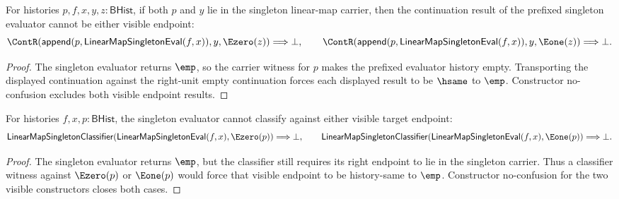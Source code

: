 \begin{theorem}
\label{thm:singleton-linearmap-eval-context-continuation-visible-result-absurd}
For histories $p,f,x,y,z:\mathsf{BHist}$, if both $p$ and $y$ lie in the
singleton linear-map carrier, then the continuation result of the prefixed
singleton evaluator cannot be either visible endpoint:
$$
\ContR(\mathsf{append}(p,\mathsf{LinearMapSingletonEval}(f,x)),y,\Ezero(z))
\Longrightarrow\bot,
\qquad
\ContR(\mathsf{append}(p,\mathsf{LinearMapSingletonEval}(f,x)),y,\Eone(z))
\Longrightarrow\bot.
$$
\end{theorem}
\begin{proof}
The singleton evaluator returns $\emp$, so the carrier witness for $p$ makes
the prefixed evaluator history empty. Transporting the displayed continuation
against the right-unit empty continuation forces each displayed result to be
$\hsame$ to $\emp$. Constructor no-confusion excludes both visible endpoint
results.
\end{proof}

\begin{theorem}
\label{thm:linearmap-singleton-eval-visible-target-classifier-absurd}
For histories $f,x,p:\mathsf{BHist}$, the singleton evaluator cannot classify
against either visible target endpoint:
$$
\mathsf{LinearMapSingletonClassifier}
(\mathsf{LinearMapSingletonEval}(f,x),\Ezero(p))\Longrightarrow\bot,
\qquad
\mathsf{LinearMapSingletonClassifier}
(\mathsf{LinearMapSingletonEval}(f,x),\Eone(p))\Longrightarrow\bot.
$$
\end{theorem}
\begin{proof}
The singleton evaluator returns $\emp$, but the classifier still requires its
right endpoint to lie in the singleton carrier. Thus a classifier witness
against $\Ezero(p)$ or $\Eone(p)$ would force that visible endpoint to be
history-same to $\emp$. Constructor no-confusion for the two visible
constructors closes both cases.
\end{proof}

